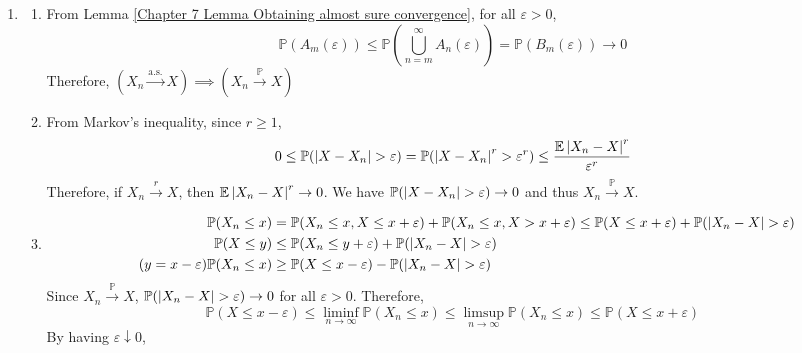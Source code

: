 \documentclass{huhtakm-template-book}
\newcommand{\prob}{\mathbb{P}}
\newcommand{\expect}{\mathbb{E}}
\begin{document}
    \begin{proofing}
        \begin{enumerate}
            \item \begin{enumerate}
                \item From Lemma \ref{Chapter 7 Lemma Obtaining almost sure convergence}, for all $\varepsilon>0$,
                \begin{equation*}
                    \prob(A_{m}(\varepsilon))\leq\prob\left(\bigcup_{n=m}^{\infty}A_{n}(\varepsilon)\right)=\prob(B_{m}(\varepsilon))\to 0
                \end{equation*}
                Therefore, $(X_{n}\xrightarrow{\text{a.s.}}X)\implies(X_{n}\xrightarrow{\prob}X)$
                \item From Markov's inequality, since $r\geq 1$,
                \begin{equation*}
                    0\leq\prob(\abs{X-X_{n}}>\varepsilon)=\prob(\abs{X-X_{n}}^{r}>\varepsilon^{r})\leq\frac{\expect\abs{X_{n}-X}^{r}}{\varepsilon^{r}}
                \end{equation*}
                Therefore, if $X_{n}\xrightarrow{r}X$, then $\expect\abs{X_{n}-X}^{r}\to 0$. We have $\prob(\abs{X-X_{n}}>\varepsilon)\to 0$ and thus $X_{n}\xrightarrow{\prob}X$.
                \item 
                \begin{align*}
                    \prob(X_{n}\leq x)&=\prob(X_{n}\leq x,X\leq x+\varepsilon)+\prob(X_{n}\leq x,X>x+\varepsilon)\leq\prob(X\leq x+\varepsilon)+\prob(\abs{X_{n}-X}>\varepsilon)\\
                    \prob(X\leq y)&\leq\prob(X_{n}\leq y+\varepsilon)+\prob(\abs{X_{n}-X}>\varepsilon)\\
                    \tag{$y=x-\varepsilon$}
                    \prob(X_{n}\leq x)
                    &\geq\prob(X\leq x-\varepsilon)-\prob(\abs{X_{n}-X}>\varepsilon)
                \end{align*}
                Since $X_{n}\xrightarrow{\prob}X$, $\prob(\abs{X_{n}-X}>\varepsilon)\to 0$ for all $\varepsilon>0$. Therefore,
                \begin{equation*}
                    \prob(X\leq x-\varepsilon)\leq\liminf_{n\to\infty}\prob(X_{n}\leq x)\leq\limsup_{n\to\infty}\prob(X_{n}\leq x)\leq\prob(X\leq x+\varepsilon)
                \end{equation*}
                By having $\varepsilon\downarrow 0$,
                \begin{equation*}

\end{equation*}
\end{enumerate}
\end{enumerate}
\end{proofing}
\end{document}
